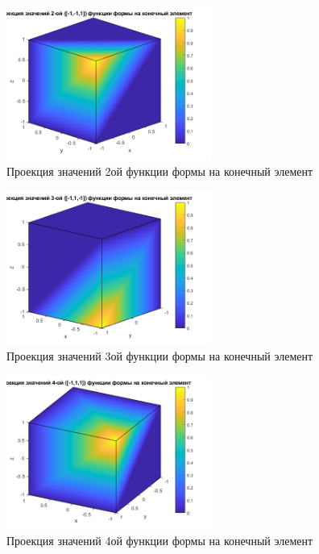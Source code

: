 \documentclass[]{article}
\begin{document}
			\begin{center}
				\begin{figure}[H]
					\centering
					\includegraphics[width=0.6\textwidth]{2}
					\caption{Проекция значений 2ой функции формы на конечный элемент}
					\label{рис. 4}
				\end{figure}
			\end{center}
		
			\begin{center}
				\begin{figure}[H]
					\centering
					\includegraphics[width=0.6\textwidth]{3}
					\caption{Проекция значений 3ой функции формы на конечный элемент}
					\label{рис. 5}
				\end{figure}
			\end{center}
		
			\begin{center}
				\begin{figure}[H]
					\centering
					\includegraphics[width=0.6\textwidth]{4}
					\caption{Проекция значений 4ой функции формы на конечный элемент}
					\label{рис. 6}
				\end{figure}
			\end{center}
		
\end{document}
